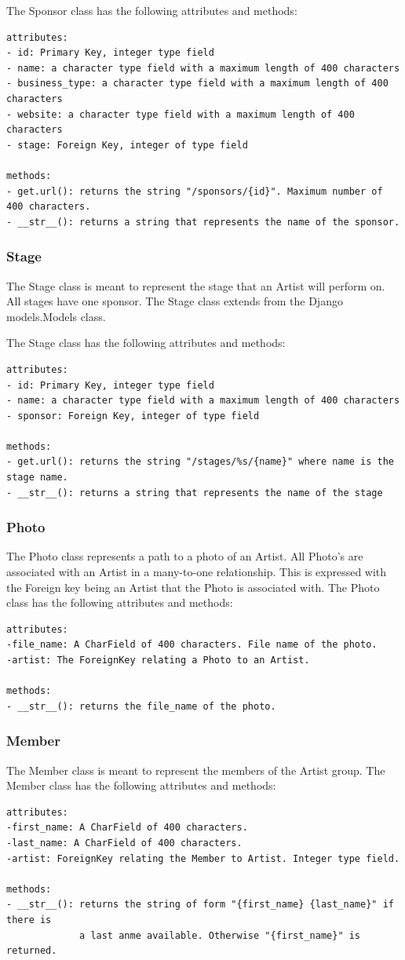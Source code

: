 \documentclass[12pt,english]{scrartcl}
\begin{document}
The Sponsor class has the following attributes and methods:
\begin{verbatim}
attributes:
- id: Primary Key, integer type field
- name: a character type field with a maximum length of 400 characters
- business_type: a character type field with a maximum length of 400 characters
- website: a character type field with a maximum length of 400 characters
- stage: Foreign Key, integer of type field

methods:
- get.url(): returns the string "/sponsors/{id}". Maximum number of 400 characters.
- __str__(): returns a string that represents the name of the sponsor.
\end{verbatim}

\subsubsection{Stage}
The Stage class is meant to represent the stage that an Artist will perform on. All stages
have one sponsor. The Stage class extends from the Django models.Models class.

The Stage class has the following attributes and methods:
\begin{verbatim}
attributes:
- id: Primary Key, integer type field
- name: a character type field with a maximum length of 400 characters
- sponsor: Foreign Key, integer of type field

methods:
- get.url(): returns the string "/stages/%s/{name}" where name is the stage name.
- __str__(): returns a string that represents the name of the stage
\end{verbatim}

\subsubsection{Photo}
The Photo class represents a path to a photo of an Artist. 
All Photo's are associated with an Artist in a many-to-one relationship.
This is expressed with the Foreign key being an Artist that the Photo is associated with. 
The Photo class has the following attributes and methods:
\begin{verbatim}
attributes:
-file_name: A CharField of 400 characters. File name of the photo. 
-artist: The ForeignKey relating a Photo to an Artist.

methods:
- __str__(): returns the file_name of the photo.
\end{verbatim}

\subsubsection{Member}
The Member class is meant to represent the members of the Artist group. The Member class has the following attributes and methods:
\begin{verbatim}
attributes:
-first_name: A CharField of 400 characters. 
-last_name: A CharField of 400 characters.
-artist: ForeignKey relating the Member to Artist. Integer type field.

methods:
- __str__(): returns the string of form "{first_name} {last_name}" if there is
             a last anme available. Otherwise "{first_name}" is returned.
\end{verbatim}
\end{document}
